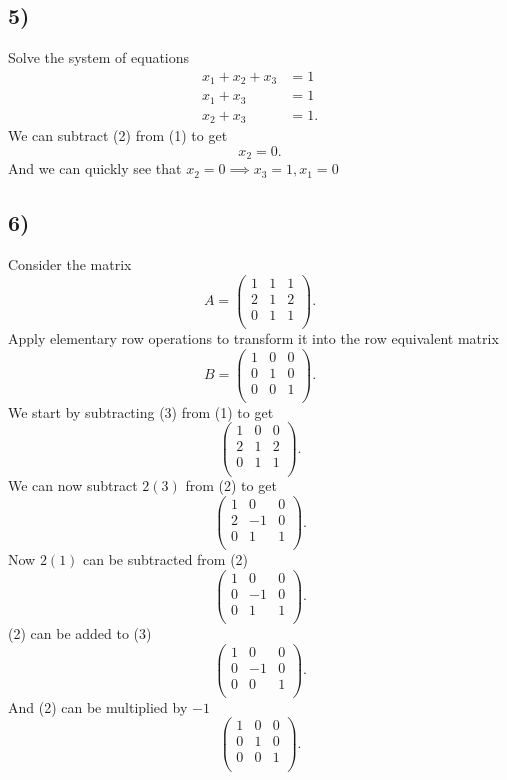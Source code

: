 \subsection*{5)}
Solve the system of equations
\begin{align*}
  x_1 + x_2 + x_3 &= 1\\
  x_1 + x_3 &= 1 \\
  x_2 + x_3 &= 1
.\end{align*}
\bigbreak
We can subtract (2) from (1) to get
\[ 
x_2 = 0
.\]
And we can quickly see that $x_2 = 0 \implies x_3 = 1, x_1 = 0$



\subsection*{6)}
Consider the matrix
\[ 
A = \begin{pmatrix}
1 & 1 & 1\\
2 & 1 & 2\\
0 & 1 & 1\\
\end{pmatrix}
.\]
Apply elementary row operations to transform it into the row equivalent matrix
\[ 
B = \begin{pmatrix}
1 & 0 & 0\\
0 & 1 & 0\\
0 & 0 & 1\\
\end{pmatrix}
.\]
\bigbreak
We start by subtracting (3) from (1) to get
\[ 
\begin{pmatrix}
1 & 0 & 0\\
2 & 1 & 2\\
0 & 1 & 1\\
\end{pmatrix}
.\]
We can now subtract $2(3)$ from (2) to get
\[ 
\begin{pmatrix}
1 & 0 & 0\\
2 & -1 & 0\\
0 & 1 & 1\\
\end{pmatrix}
.\]
Now $2(1)$ can be subtracted from (2)
\[ 
\begin{pmatrix}
1 & 0 & 0 \\
0 & -1 & 0\\
0 & 1 & 1 \\
\end{pmatrix}
.\]
(2) can be added to (3)
\[ 
\begin{pmatrix}
1 & 0 & 0\\
0 & -1 & 0\\
0 & 0 & 1\\
\end{pmatrix}
.\]
And (2) can be multiplied by $-1$
\[ 
\begin{pmatrix}
1 & 0 & 0\\
0 & 1 & 0\\
0 & 0 & 1\\
\end{pmatrix}
.\]



